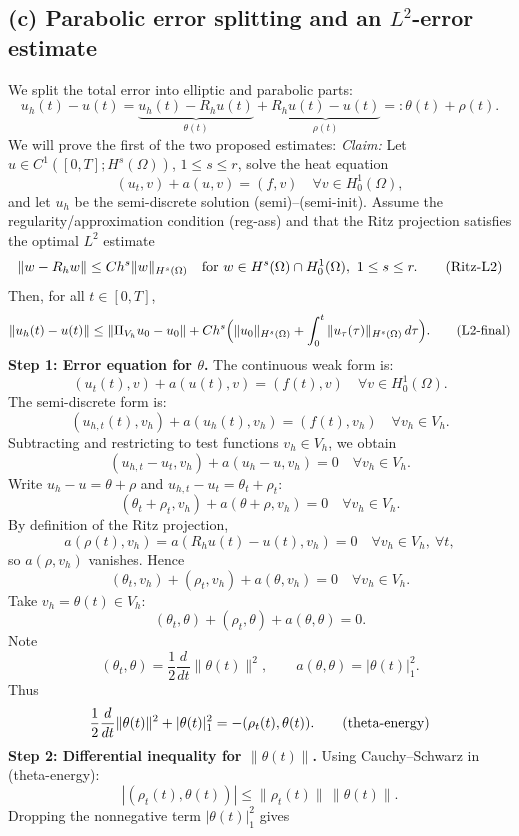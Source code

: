 \subsection*{(c) Parabolic error splitting and an $L^2$-error estimate}
We split the total error into elliptic and parabolic parts:
\[
    u_h(t) - u(t)
    = \underbrace{u_h(t) - R_h u(t)}_{\theta(t)}
    + \underbrace{R_h u(t) - u(t)}_{\rho(t)}
    =: \theta(t) + \rho(t).
\]
We will prove the first of the two proposed estimates:
\emph{Claim:} Let \(u\in C^1([0,T];H^s(\Omega))\), \(1\le s\le r\), solve the heat equation
\[
    (u_t,v) + a(u,v) = (f,v)\quad \forall v\in H^1_0(\Omega),
\]
and let \(u_h\) be the semi-discrete solution (semi)--(semi-init).
Assume the regularity/approximation condition (reg-ass) and that
the Ritz projection satisfies the optimal \(L^2\) estimate
\[
    \|w - R_h w\| \le C h^s \|w\|_{H^s(\Omega)}
    \quad\text{for } w\in H^s(\Omega)\cap H^1_0(\Omega),\ 1\le s\le r. \tag{\text{Ritz-L2}}
\]
Then, for all \(t\in[0,T]\),
\[
    \|u_h(t) - u(t)\|
    \le \|\Pi_{V_h}u_0 - u_0\|
    + C h^s\Bigl(\|u_0\|_{H^s(\Omega)}
    + \int_0^t \|u_\tau(\tau)\|_{H^s(\Omega)}\,d\tau\Bigr). \tag{\text{L2-final}}
\]
\textbf{Step 1: Error equation for $\theta$.}
The continuous weak form is:
\[
    (u_t(t),v) + a(u(t),v) = (f(t),v) \quad \forall v\in H^1_0(\Omega).
\]
The semi-discrete form is:
\[
    (u_{h,t}(t),v_h) + a(u_h(t),v_h) = (f(t),v_h) \quad \forall v_h\in V_h.
\]
Subtracting and restricting to test functions \(v_h\in V_h\), we obtain
\[
    (u_{h,t} - u_t, v_h) + a(u_h - u, v_h) = 0
    \quad \forall v_h\in V_h.
\]
Write \(u_h - u = \theta + \rho\) and \(u_{h,t} - u_t = \theta_t + \rho_t\):
\[
    (\theta_t + \rho_t, v_h) + a(\theta + \rho, v_h) = 0
    \quad\forall v_h\in V_h.
\]
By definition of the Ritz projection,
\[
    a(\rho(t), v_h) = a(R_h u(t) - u(t),v_h) = 0
    \quad \forall v_h\in V_h,\ \forall t,
\]
so $a(\rho,v_h)$ vanishes. Hence
\[
    (\theta_t,v_h) + (\rho_t,v_h) + a(\theta,v_h) = 0
    \quad\forall v_h\in V_h.
\]
Take \(v_h = \theta(t)\in V_h\):
\[
    (\theta_t,\theta) + (\rho_t,\theta) + a(\theta,\theta) = 0.
\]
Note
\[
    (\theta_t,\theta) = \frac{1}{2}\frac{d}{dt}\|\theta(t)\|^2,
    \qquad
    a(\theta,\theta) = |\theta(t)|_1^2.
\]
Thus
\[
    \frac{1}{2}\frac{d}{dt}\|\theta(t)\|^2 + |\theta(t)|_1^2
    = -(\rho_t(t),\theta(t)). \tag{\text{theta-energy}}
\]
\textbf{Step 2: Differential inequality for $\|\theta(t)\|$.}
Using Cauchy--Schwarz in (theta-energy):
\[
    |(\rho_t(t),\theta(t))| \le \|\rho_t(t)\|\,\|\theta(t)\|.
\]
Dropping the nonnegative term $|\theta(t)|_1^2$ gives
